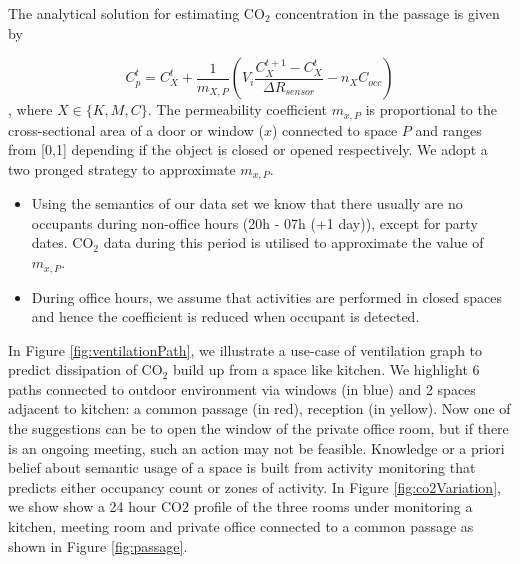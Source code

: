  The analytical solution for estimating CO$_2$ concentration in the passage is given by 

\begin{equation}
    C^t_p = C^t_X + \frac{1}{m_{X,P}} (V_i \frac{C^{t+1}_X - C^t_X}{\Delta R_{sensor}} - n_X C_{occ} )
\end{equation}
, where $X \in \{K, M, C \}$. The permeability coefficient $m_{x,P}$ is proportional to the cross-sectional area of a door or window ($x$) connected to space $P$ and ranges from [0,1] depending if the object is closed or opened respectively. We adopt a two pronged strategy to approximate $m_{x,P}$. 
\begin{itemize}
    \item Using the semantics of our data set we know that there usually are no occupants during non-office hours (20h - 07h (+1 day)), except for party dates. CO$_2$ data during this period is utilised to approximate the value of $m_{x,P}$.
    \item During office hours, we assume that activities are performed in closed spaces and hence the coefficient is reduced when occupant is detected. 
\end{itemize}





In Figure \ref{fig:ventilationPath}, we illustrate a use-case of ventilation graph to predict dissipation of CO$_2$ build up from a space like kitchen. We highlight  6 paths connected to outdoor environment via windows (in blue) and 2 spaces adjacent to kitchen: a common passage (in red), reception (in yellow).  Now one of the suggestions can be to open the window of the private office room, but if there is an ongoing meeting, such an action may not be feasible. Knowledge or a priori belief about semantic usage of a space is built from activity monitoring that predicts either occupancy count or zones of activity. In Figure \ref{fig:co2Variation}, we show show a 24 hour CO$2$ profile of the three rooms under monitoring a kitchen, meeting room and private office connected to a common passage as shown in Figure \ref{fig:passage}.




